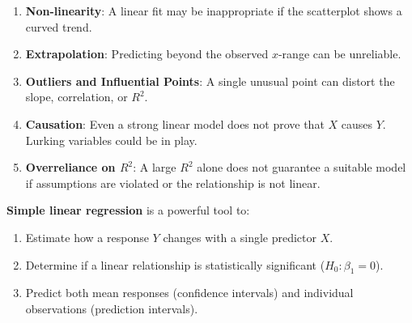 \documentclass[10pt, total={6in, 8in}]{extarticle}
\begin{document}
\begin{enumerate}
    \item \textbf{Non-linearity}: A linear fit may be inappropriate if the scatterplot shows a curved trend.
    \item \textbf{Extrapolation}: Predicting beyond the observed $x$-range can be unreliable.
    \item \textbf{Outliers and Influential Points}: A single unusual point can distort the slope, correlation, or $R^2$.
    \item \textbf{Causation}: Even a strong linear model does not prove that $X$ causes $Y$. Lurking variables could be in play.
    \item \textbf{Overreliance on $R^2$}: A large $R^2$ alone does not guarantee a suitable model if assumptions are violated or the relationship is not linear.
\end{enumerate}
\begin{takeaway-box}{}{}
\textbf{Simple linear regression} is a powerful tool to:
\begin{enumerate}
    \item Estimate how a response $Y$ changes with a single predictor $X$.
    \item Determine if a linear relationship is statistically significant ($H_0:\beta_1=0$).
    \item Predict both mean responses (confidence intervals) and individual observations (prediction intervals).
\end{enumerate}
\end{takeaway-box}
\end{document}
